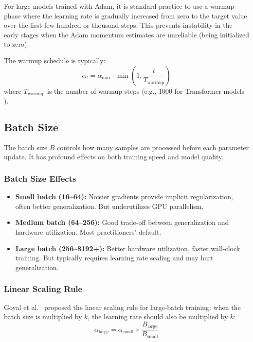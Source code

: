 For large models trained with Adam, it is standard practice to use a warmup phase where the learning rate is gradually increased from zero to the target value over the first few hundred or thousand steps. This prevents instability in the early stages when the Adam momentum estimates are unreliable (being initialized to zero).

The warmup schedule is typically:
\begin{equation}
\alpha_t = \alpha_{\max} \cdot \min\!\left(1, \frac{t}{T_{\text{warmup}}}\right)
\end{equation}
where $T_{\text{warmup}}$ is the number of warmup steps (e.g., 1000 for Transformer models \cite{vaswani2017attention}).

\subsection{Batch Size}

The batch size $B$ controls how many samples are processed before each parameter update. It has profound effects on both training speed and model quality.

\subsubsection{Batch Size Effects}

\begin{itemize}
    \item \textbf{Small batch (16--64):} Noisier gradients provide implicit regularization, often better generalization. But underutilizes GPU parallelism.
    \item \textbf{Medium batch (64--256):} Good trade-off between generalization and hardware utilization. Most practitioners' default.
    \item \textbf{Large batch (256--8192+):} Better hardware utilization, faster wall-clock training. But typically requires learning rate scaling and may hurt generalization.
\end{itemize}

\subsubsection{Linear Scaling Rule}

Goyal et al.\ \cite{goyal2017accurate} proposed the linear scaling rule for large-batch training: when the batch size is multiplied by $k$, the learning rate should also be multiplied by $k$:
\begin{equation}
\alpha_{\text{large}} = \alpha_{\text{small}} \times \frac{B_{\text{large}}}{B_{\text{small}}}
\end{equation}

